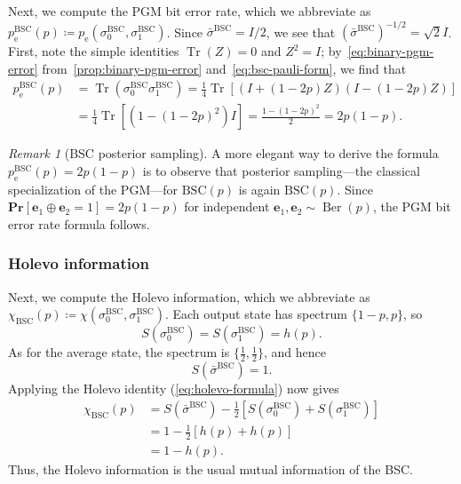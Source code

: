 \documentclass[11pt]{article}
\theoremstyle{remark}
\newtheorem{remark}{Remark}[section]
\newcommand{\Ber}{\operatorname{Ber}}
\newcommand{\Tr}{\operatorname{Tr}}
\newcommand{\Prb}{\mathbf{Pr}}
\newcommand{\be}{\mathbf{e}}
\newcommand{\BSC}{\mathrm{BSC}}
\begin{document}
Next, we compute the PGM bit error rate, which we abbreviate as $p_{\mathrm{e}}^{\BSC}(p) \coloneqq p_{\mathrm{e}}(\sigma_0^{\BSC},\sigma_1^{\BSC})$. Since $\bar{\sigma}^{\BSC} = I/2$, we see that $\left(\bar{\sigma}^{\BSC}\right)^{-1/2} = \sqrt{2} I$. First, note the simple identities $\Tr(Z) = 0$ and $Z^2 = I$; by~\eqref{eq:binary-pgm-error} from~\cref{prop:binary-pgm-error} and~\eqref{eq:bsc-pauli-form}, we find that
\begin{align*}
p_{\mathrm{e}}^{\BSC}(p)
&= \Tr\left(\sigma_0^{\BSC}\sigma_1^{\BSC}\right)
= \frac{1}{4}\Tr\left[\left(I+(1-2p)Z\right)\left(I-(1-2p)Z\right)\right]\\
&= \frac{1}{4}\Tr\left[\left(1-(1-2p)^2\right)I\right]
= \frac{1-(1-2p)^2}{2}
= 2p(1-p).
\end{align*}

\begin{remark}[BSC posterior sampling]
\label{rem:bsc-posterior}
A more elegant way to derive the formula $p_{\mathrm{e}}^{\BSC}(p) = 2p(1-p)$ is to observe that posterior sampling---the classical specialization of the PGM---for $\BSC(p)$ is again $\BSC(p)$. Since $\Prb[\be_1 \oplus \be_2 = 1] = 2p(1-p)$ for independent $\be_1,\be_2 \sim \Ber(p)$, the PGM bit error rate formula follows.
\end{remark}

\subsubsection{Holevo information}
\label{subsubsec:bsc-holevo}

Next, we compute the Holevo information, which we abbreviate as $\chi_\BSC(p) \coloneqq \chi(\sigma_0^{\BSC},\sigma_1^{\BSC})$. Each output state has spectrum $\{1-p,p\}$, so
\begin{equation*}
S(\sigma_0^{\BSC}) = S(\sigma_1^{\BSC}) = h(p).
\end{equation*}
As for the average state, the spectrum is $\{\frac{1}{2},\frac{1}{2}\}$, and hence
\begin{equation*}
S(\bar{\sigma}^{\BSC}) = 1.
\end{equation*}
Applying the Holevo identity (\cref{eq:holevo-formula}) now gives
\begin{align*}
\chi_{\BSC}(p)
&= S(\bar{\sigma}^{\BSC})-\frac{1}{2}\left[S(\sigma_0^{\BSC})+S(\sigma_1^{\BSC})\right]\\
&= 1-\frac{1}{2}\left[h(p)+h(p)\right] \\
&= 1-h(p).
\end{align*}
Thus, the Holevo information is the usual mutual information of the BSC.
\end{document}
